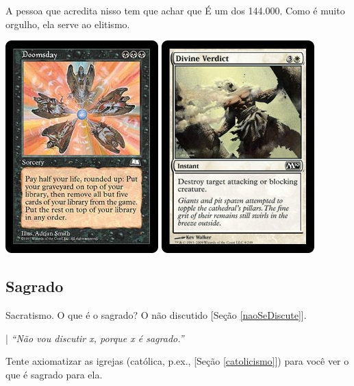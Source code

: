 \documentclass[12pt,a4paper]{article}
\begin{document}
			A pessoa que acredita nisso tem que achar que \'E um dos 144.000. Como \'e muito orgulho, ela serve ao elitismo.

			\begin{center}
			\includegraphics{doomsday} \includegraphics{verdict}
			\end{center}

		\subsection{Sagrado}

			\begin{flushright}
			\end{flushright}

			Sacratismo. O que \'e o sagrado? O n\~ao discutido [Se\c{c}\~ao \ref{naoSeDiscute}].

			| \emph{\textquotedblleft N\~ao vou discutir x, porque x \'e sagrado.\textquotedblright}

			Tente axiomatizar\cite{def} as igrejas (cat\'olica, p.ex., [Se\c{c}\~ao \ref{catolicismo}]) para voc\^e ver o que \'e sagrado para ela.
\end{document}
